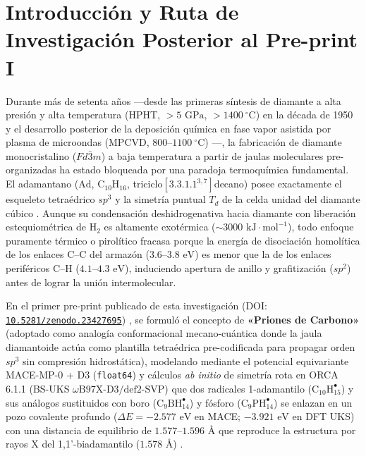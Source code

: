 \documentclass[10pt,twocolumn,a4paper]{article}
\begin{document}
\section{Introducción y Ruta de Investigación Posterior al Pre-print I}

Durante más de setenta años —desde las primeras síntesis de diamante a alta presión y alta temperatura (HPHT, $>5\text{ GPa}$, $>1400\ ^\circ\text{C}$) en la década de 1950 y el desarrollo posterior de la deposición química en fase vapor asistida por plasma de microondas (MPCVD, $800\text{--}1100\ ^\circ\text{C}$) \cite{Asmussen2002,Silva2009}—, la fabricación de diamante monocristalino ($Fd\bar{3}m$) a baja temperatura a partir de jaulas moleculares pre-organizadas ha estado bloqueada por una paradoja termoquímica fundamental. El adamantano ($\text{Ad}$, $\text{C}_{10}\text{H}_{16}$, triciclo$[3.3.1.1^{3,7}]$decano) posee exactamente el esqueleto tetraédrico $sp^3$ y la simetría puntual $T_d$ de la celda unidad del diamante cúbico \cite{Dahl2003}. Aunque su condensación deshidrogenativa hacia diamante con liberación estequiométrica de $\text{H}_2$ es altamente exotérmica ($\sim 3000\text{ kJ}\cdot\text{mol}^{-1}$), todo enfoque puramente térmico o pirolítico fracasa porque la energía de disociación homolítica de los enlaces $\text{C--C}$ del armazón ($3.6\text{--}3.8\text{ eV}$) es menor que la de los enlaces periféricos $\text{C--H}$ ($4.1\text{--}4.3\text{ eV}$), induciendo apertura de anillo y grafitización ($sp^2$) antes de lograr la unión intermolecular.

En el primer pre-print publicado de esta investigación (DOI: \href{https://doi.org/10.5281/zenodo.23427695}{\texttt{10.5281/zenodo.23427695}}) \cite{RodriguezGarcia2026_Part1}, se formuló el concepto de \textbf{«Priones de Carbono»} (adoptado como analogía conformacional mecano-cuántica donde la jaula diamantoide actúa como plantilla tetraédrica pre-codificada para propagar orden $sp^3$ sin compresión hidrostática), modelando mediante el potencial equivariante MACE-MP-0 + D3 (\texttt{float64}) y cálculos \textit{ab initio} de simetría rota en ORCA 6.1.1 (BS-UKS $\omega\text{B97X-D3/def2-SVP}$) que dos radicales 1-adamantilo ($\text{C}_{10}\text{H}_{15}^\bullet$) y sus análogos sustituidos con boro ($\text{C}_9\text{BH}_{14}^\bullet$) y fósforo ($\text{C}_9\text{PH}_{14}^\bullet$) se enlazan en un pozo covalente profundo ($\Delta E = -2.577\text{ eV}$ en MACE; $-3.921\text{ eV}$ en DFT UKS) con una distancia de equilibrio de $1.577\text{--}1.596\text{ \AA}$ que reproduce la estructura por rayos X del 1,1'-biadamantilo ($1.578\text{ \AA}$) \cite{Alden1968}.
\end{document}
